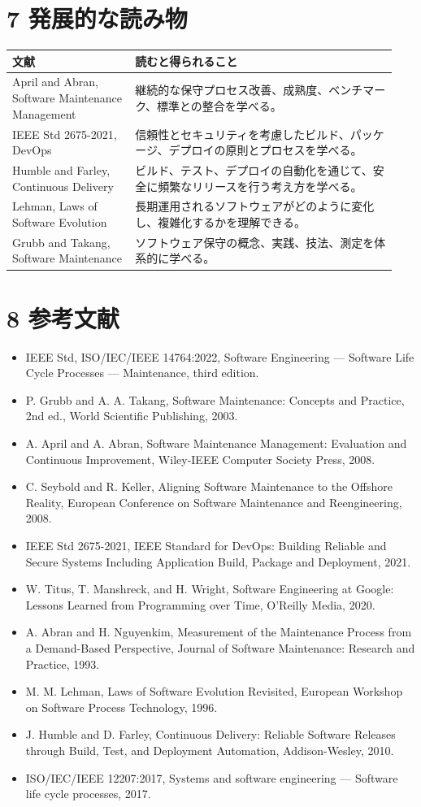 \documentclass[a4paper,11pt]{ltjsarticle}
\begin{document}
\section{7 発展的な読み物}
\begin{longtable}{p{0.30\linewidth}p{0.64\linewidth}}
\toprule
文献 & 読むと得られること \\
\midrule
\endhead
April and Abran, Software Maintenance Management & 継続的な保守プロセス改善、成熟度、ベンチマーク、標準との整合を学べる。 \\
IEEE Std 2675-2021, DevOps & 信頼性とセキュリティを考慮したビルド、パッケージ、デプロイの原則とプロセスを学べる。 \\
Humble and Farley, Continuous Delivery & ビルド、テスト、デプロイの自動化を通じて、安全に頻繁なリリースを行う考え方を学べる。 \\
Lehman, Laws of Software Evolution & 長期運用されるソフトウェアがどのように変化し、複雑化するかを理解できる。 \\
Grubb and Takang, Software Maintenance & ソフトウェア保守の概念、実践、技法、測定を体系的に学べる。 \\
\bottomrule
\end{longtable}
\section{8 参考文献}
\begin{itemize}
\item IEEE Std, ISO/IEC/IEEE 14764:2022, Software Engineering — Software Life Cycle Processes — Maintenance, third edition.
\item P. Grubb and A. A. Takang, Software Maintenance: Concepts and Practice, 2nd ed., World Scientific Publishing, 2003.
\item A. April and A. Abran, Software Maintenance Management: Evaluation and Continuous Improvement, Wiley-IEEE Computer Society Press, 2008.
\item C. Seybold and R. Keller, Aligning Software Maintenance to the Offshore Reality, European Conference on Software Maintenance and Reengineering, 2008.
\item IEEE Std 2675-2021, IEEE Standard for DevOps: Building Reliable and Secure Systems Including Application Build, Package and Deployment, 2021.
\item W. Titus, T. Manshreck, and H. Wright, Software Engineering at Google: Lessons Learned from Programming over Time, O’Reilly Media, 2020.
\item A. Abran and H. Nguyenkim, Measurement of the Maintenance Process from a Demand-Based Perspective, Journal of Software Maintenance: Research and Practice, 1993.
\item M. M. Lehman, Laws of Software Evolution Revisited, European Workshop on Software Process Technology, 1996.
\item J. Humble and D. Farley, Continuous Delivery: Reliable Software Releases through Build, Test, and Deployment Automation, Addison-Wesley, 2010.
\item ISO/IEC/IEEE 12207:2017, Systems and software engineering — Software life cycle processes, 2017.
\end{itemize}
\end{document}
